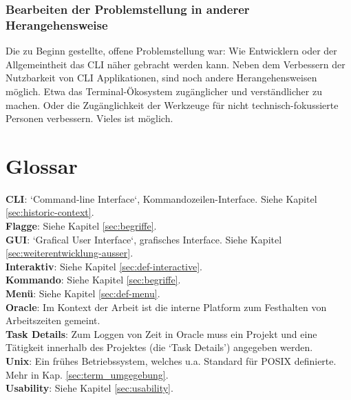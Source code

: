 \documentclass[oneside,bibliography=totocnumbered,BCOR=5mm]{scrbook}
\begin{document}
\subsection{Bearbeiten der Problemstellung in anderer Herangehensweise}

Die zu Beginn gestellte, offene Problemstellung war: Wie Entwicklern oder der
Allgemeintheit das CLI näher gebracht werden kann. Neben dem Verbessern der
Nutzbarkeit von CLI Applikationen, sind noch andere Herangehensweisen möglich.
Etwa das Terminal-Ökosystem zugänglicher und verständlicher zu machen. Oder
die Zugänglichkeit der Werkzeuge für nicht technisch-fokussierte Personen
verbessern. Vieles ist möglich.

\printbibliography[
heading=bibintoc,
title={Quellenverzeichnis}
]

\newpage
\chapter{Glossar}

\textbf{CLI}: `Command-line Interface`, Kommandozeilen-Interface. Siehe Kapitel \ref{sec:historic-context}.
\\
\textbf{Flagge}: Siehe Kapitel \ref{sec:begriffe}.
\\
\textbf{GUI}: `Grafical User Interface`, grafisches Interface. Siehe Kapitel \ref{sec:weiterentwicklung-ausser}.
\\
\textbf{Interaktiv}: Siehe Kapitel \ref{sec:def-interactive}.
\\
\textbf{Kommando}: Siehe Kapitel \ref{sec:begriffe}.
\\
\textbf{Menü}: Siehe Kapitel \ref{sec:def-menu}.
\\
\textbf{Oracle}: Im Kontext der Arbeit ist die interne Platform zum Festhalten von Arbeitszeiten gemeint.
\\
\textbf{Task Details}: Zum Loggen von Zeit in Oracle muss ein Projekt und eine Tätigkeit innerhalb des Projektes (die `Task Details') angegeben werden.
\\
\textbf{Unix}: Ein frühes Betriebssystem, welches u.a. Standard für POSIX definierte. Mehr in Kap. \ref{sec:term_umgegebung}.
\\
\textbf{Usability}: Siehe Kapitel \ref{sec:usability}.
\end{document}
